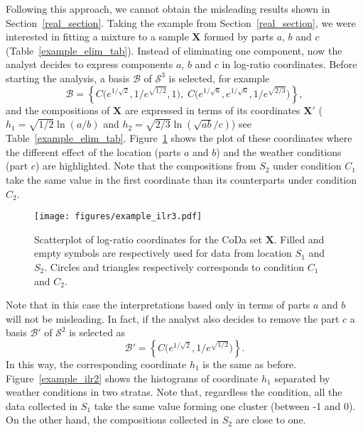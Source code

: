\documentclass[12pt, a4paper]{article}
\begin{document}
Following this approach, we cannot obtain the misleading results shown in Section~\ref{real_section}. Taking the example from Section~\ref{real_section}, we were interested in fitting a mixture to a sample $\mathbf{X}$ formed by parts $a$, $b$ and $c$ (Table~\ref{example_elim_tab}). Instead of eliminating one component, now the analyst decides to express components $a$, $b$ and $c$ in log-ratio coordinates. Before starting the analysis, a basis $\mathcal{B}$ of $\mathcal{S}^3$ is selected, for example
\begin{equation}\label{basis3}
\mathcal{B} = \left\{ C\Big( e^{1/\sqrt{2}}, 1/e^{\sqrt{1/2}}, 1 \Big), \; C\Big( e^{1/\sqrt{6}}, e^{1/\sqrt{6}}, 1/e^{\sqrt{2/3}} \Big) \right\},
\end{equation}
and the compositions of $\mathbf{X}$ are expressed in terms of its coordinates 
$\mathbf{X}'$ ($h_1 = \sqrt{1/2} \ln(a/b)$ and $h_2 = \sqrt{2/3} \ln(\sqrt{ab} / c)$) see Table~\ref{example_elim_tab}. Figure~\ref{example_ilr3} shows the plot of these coordinates where the different effect of the location (parts $a$ and $b$) and the weather conditions (part $c$) are highlighted. Note that the compositions from $S_2$ under condition $C_1$ take the same value in the first coordinate than its counterparts under condition $C_2$. 

\begin{figure}[thbp]
\centering
\texttt{[image: figures/example\_ilr3.pdf]}
\caption{Scatterplot of log-ratio coordinates for the CoDa set $\mathbf{X}$. Filled and empty symbols are respectively used for data from location $S_1$ and $S_2$. Circles and triangles respectively corresponds to condition $C_1$ and $C_2$.}\label{example_ilr3}
\end{figure}

Note that in this case the interpretations based only in terms of parts $a$ and $b$ will not be misleading. In fact, if the analyst also decides to remove the part $c$ a basis $\mathcal{B}'$ of $\mathcal{S}^2$ is selected as
\[
\mathcal{B}' = \left\{ C\Big( e^{1/\sqrt{2}}, 1/e^{\sqrt{1/2}} \Big) \right\}.
\]
In this way, the corresponding coordinate $h_1$ is the same as before. Figure~\ref{example_ilr2} 
shows the histograms of coordinate $h_1$ separated by weather conditions in two stratas. Note that, regardless the condition, all the data collected in $S_1$ take the same value forming one cluster (between -1 and 0). On the other hand, the compositions collected in $S_2$ are close to one.
\end{document}
